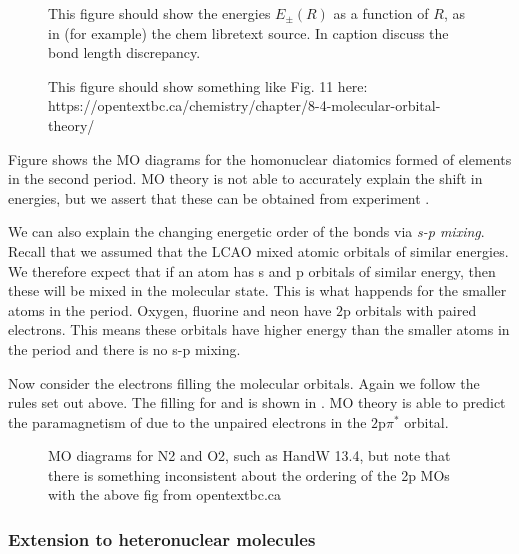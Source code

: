 
\begin{figure}
  \caption{This figure should show the energies $E_\pm(R)$ as a function of $R$,
  as in (for example) the chem libretext source. In caption discuss the bond
  length discrepancy.}
  \label{diaspec:fig:Henergies}
\end{figure}

\begin{figure}
  \caption{This figure should show something like Fig. 11 here:
  https://opentextbc.ca/chemistry/chapter/8-4-molecular-orbital-theory/
  }
  \label{diaspec:fig:2ndperiod}
\end{figure}

Figure  shows the MO diagrams for the
homonuclear diatomics formed of elements in the second period. MO theory is not
able to accurately explain the shift in energies, but we assert that these can
be obtained from experiment .

We can also explain the changing energetic order of the bonds via \emph{s-p
mixing}. Recall that we assumed that the LCAO mixed atomic orbitals of similar
energies. We therefore expect that if an atom has s and p orbitals of similar
energy, then these will be mixed in the molecular state. This is what happends
for the smaller atoms in the period. Oxygen, fluorine and neon have $\text{2p}$
orbitals with paired electrons. This means these orbitals have higher energy
than the smaller atoms in the period and there is no s-p mixing.

Now consider the electrons filling the molecular orbitals. Again we follow the
rules set out above. The filling for  and  is shown in
. MO theory is able to predict the paramagnetism of
 due to the unpaired electrons in the $\text{2p}\pi^*$ orbital.

\begin{figure}
  \caption{MO diagrams for N2 and O2, such as HandW 13.4, but note that there is
  something inconsistent about the ordering of the 2p MOs with the above fig
  from opentextbc.ca
  }
  \label{diaspec:fig:2ndperiod}
\end{figure}


\subsubsection{Extension to heteronuclear molecules}

